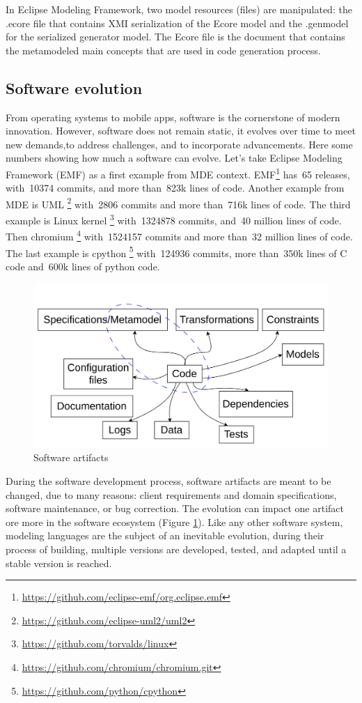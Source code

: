 In Eclipse Modeling Framework, two model resources (files) are manipulated: the .ecore file that contains  XMI serialization of the Ecore model and the .genmodel for the serialized generator model. The Ecore file is the document that contains the metamodeled main concepts that are used in code generation process.

\subsection{Software evolution}
From operating systems to mobile apps, software is the cornerstone of modern innovation. However, software does not remain static, it evolves over time to meet new demands,to address challenges, and to incorporate advancements. Here some numbers showing how much a software can evolve. Let's take Eclipse Modeling Framework (EMF) as a first example from MDE context. EMF\footnote{\url{https://github.com/eclipse-emf/org.eclipse.emf}} has~65 releases, with~10374 commits, and more than~823k lines of code. Another example from MDE is UML \footnote{\url{https://github.com/eclipse-uml2/uml2}} with~2806 commits and more than~716k lines of code. The third example is Linux kernel \footnote{\url{https://github.com/torvalds/linux}} with~1324878 commits, and~40 million lines of code. Then
chromium \footnote{\url{https://github.com/chromium/chromium.git}} with~1524157 commits and more than~32 million lines of code. The last example is
cpython \footnote{\url{https://github.com/python/cpython}} with~124936 commits, more than~350k lines of C code and~600k lines of python code.
\begin{figure}[t]
	\begin{center}
		\includegraphics[width=0.6\linewidth]{./pics/soaPics/softwareartifacts.png}
	\end{center}
	\caption{Software artifacts}
	\label{fig:softwareartifacts}
\end{figure}
During the software development process, software artifacts are meant to be changed, due to many reasons: client requirements and domain specifications, software maintenance, or bug correction. The evolution can impact one artifact ore more in the software ecosystem (Figure \ref{fig:softwareartifacts}). Like any other software system, modeling languages are the subject of an inevitable evolution, during their process of building, multiple versions are developed, tested, and adapted until a stable version is reached. 

